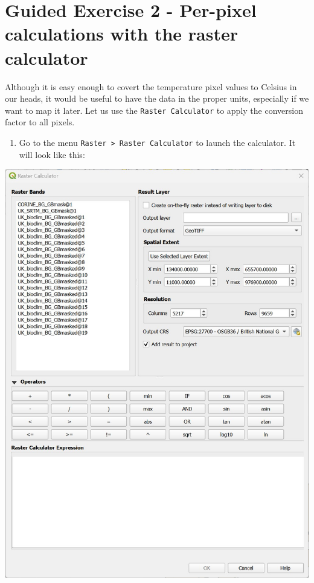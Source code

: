 \documentclass[
  letterpaper,
  DIV=11,
  numbers=noendperiod]{scrreprt}
\providecommand{\tightlist}{%
  \setlength{\itemsep}{0pt}\setlength{\parskip}{0pt}}\usepackage{longtable,booktabs,array}
\begin{document}
\section{Guided Exercise 2 - Per-pixel calculations with the raster
calculator}\label{guided-exercise-2---per-pixel-calculations-with-the-raster-calculator}

Although it is easy enough to covert the temperature pixel values to
Celsius in our heads, it would be useful to have the data in the proper
units, especially if we want to map it later. Let us use the
\texttt{Raster\ Calculator} to apply the conversion factor to all
pixels.

\begin{enumerate}
\def\labelenumi{(\arabic{enumi})}
\setcounter{enumi}{164}
\tightlist
\item
  Go to the menu \texttt{Raster\ \textgreater{}\ Raster\ Calculator} to
  launch the calculator. It will look like this:
\end{enumerate}

\includegraphics{images/lab_6/lab_6_fig2_rastercalc.jpg}
\end{document}
